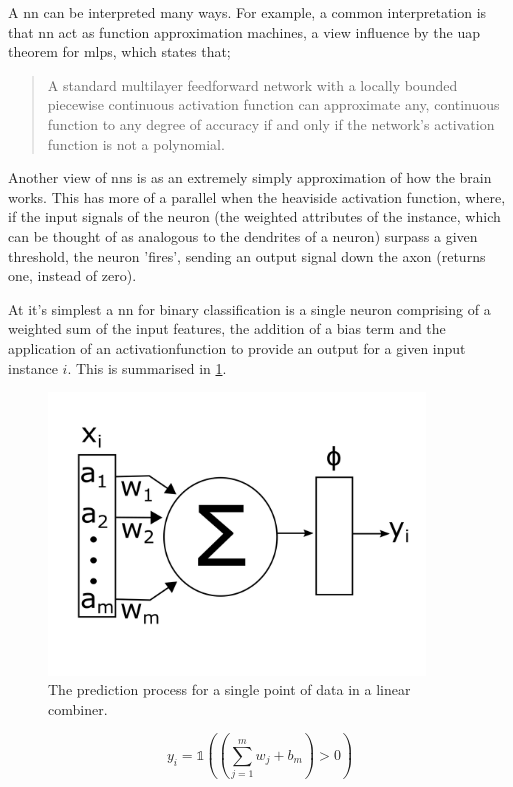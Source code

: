 A \gls{nn} can be interpreted many ways. For example, a common interpretation is that \gls{nn} act as function approximation machines, a view influence by the \gls{uap} theorem for \gls{mlp}s, which states that;

\begin{quote}
    A standard multilayer feedforward network with a locally bounded piecewise continuous activation function can approximate any, continuous function to any degree of accuracy if and only if the network's activation function is not a polynomial.\cite{uap_mlp}
\end{quote}

Another view of \gls{nn}s is as an extremely simply approximation of how the brain works. This has more of a parallel when the heaviside activation function, where, if the input signals of the neuron (the weighted attributes of the \gls{instance}, which can be thought of as analogous to the dendrites of a neuron) surpass a given threshold, the neuron 'fires', sending an output signal down the axon (returns one, instead of zero).
\bigskip

At it's simplest a \gls{nn} for binary classification is a single \gls{neuron} comprising of a weighted sum of the input features, the addition of a bias term and the application of an \gls{activationfunction} to provide an output for a given input \gls{instance} $i$. This is summarised in \ref{fig:nn_simple}. 

\begin{figure}
    \centering
    \includegraphics[width=100mm]{figs/nn_simple.png}
    \caption{The prediction process for a single point of data in a linear combiner.}
    \label{fig:nn_simple}
\end{figure}

\begin{equation}
    y_i = \mathds{1} ((\sum_{j = 1}^m w_j + b_m) > 0)
    \label{eq:nn_simple_pred}
\end{equation}

